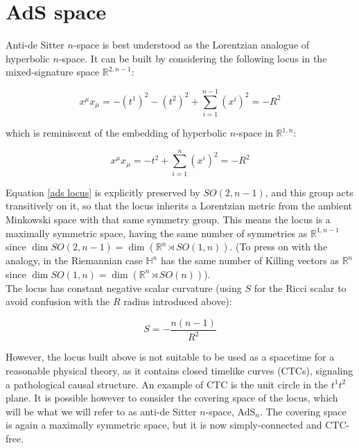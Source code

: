 
\section{AdS space}\label{app:ads}

Anti-de Sitter $n$-space is best understood as the Lorentzian analogue of hyperbolic $n$-space. It can be built by considering the following locus in the mixed-signature space $\mathbb{R}^{2,n-1}$:

\begin{equation} \label{ads locus}
x^\mu x_\mu = -(t^1)^2 - (t^2)^2 + \sum_{i=1}^{n-1} (x^i)^2  =  - R^2
\end{equation}

which is reminiscent of the embedding of hyperbolic $n$-space in $\mathbb{R}^{1,n}$:

\begin{equation}
x^\mu x_\mu = -t^2 + \sum_{i=1}^{n} (x^i)^2 = - R^2
\end{equation}

Equation \ref{ads locus} is explicitly preserved by $SO(2,n-1)$, and this group acts transitively on it, so that the locus inherits a Lorentzian metric from the ambient Minkowski space with that same symmetry group. This means the locus is a maximally symmetric space, having the same number of symmetries as $\mathbb{R}^{1,n-1}$ since $\dim SO(2,n-1) = \dim \left( \mathbb{R}^n \rtimes SO(1,n) \right)$. (To press on with the analogy, in the Riemannian case $\mathbb{H}^n$ has the same number of Killing vectors as $\mathbb{R}^n$ since $\dim SO(1,n) = \dim \left(\mathbb{R}^n \rtimes SO(n) \right)$).\\

The locus has constant negative scalar curvature (using $S$ for the Ricci scalar to avoid confusion with the $R$ radius introduced above):

\begin{equation}
S = - \frac{n(n-1)}{R^2} 
\end{equation}

However, the locus built above is not suitable to be used as a spacetime for a reasonable physical theory, as it contains closed timelike curves (CTCs), signaling a pathological causal structure. An example of CTC is the unit circle in the $t^1 t^2$ plane. It is possible however to consider the covering space of the locus, which will be what we will refer to as anti-de Sitter $n$-space, AdS$_n$. The covering space is again a maximally symmetric space, but it is now simply-connected and CTC-free.\\

